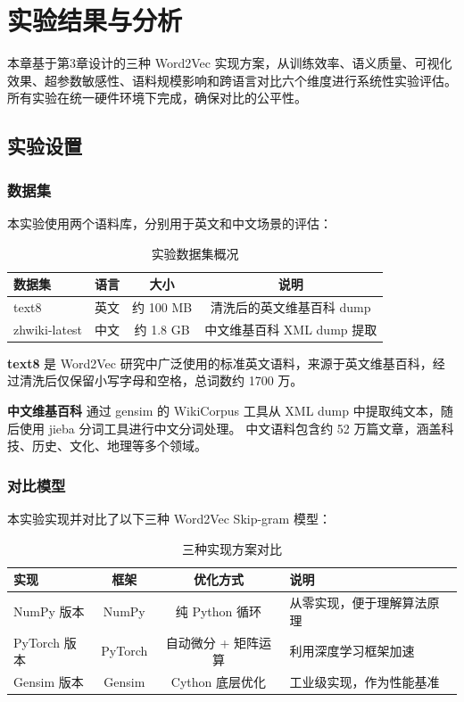 \chapter{实验结果与分析}

本章基于第3章设计的三种 Word2Vec 实现方案，从训练效率、语义质量、可视化效果、超参数敏感性、语料规模影响和跨语言对比六个维度进行系统性实验评估。
所有实验在统一硬件环境下完成，确保对比的公平性。

\section{实验设置}

\subsection{数据集}

本实验使用两个语料库，分别用于英文和中文场景的评估：

\begin{table}[htbp]
\centering
\caption{实验数据集概况}
\label{tab:dataset}
\begin{tabular}{lccc}
\toprule
\textbf{数据集} & \textbf{语言} & \textbf{大小} & \textbf{说明} \\
\midrule
text8 & 英文 & 约 100 MB & 清洗后的英文维基百科 dump \\
zhwiki-latest & 中文 & 约 1.8 GB & 中文维基百科 XML dump 提取 \\
\bottomrule
\end{tabular}
\end{table}

\textbf{text8} 是 Word2Vec 研究中广泛使用的标准英文语料，来源于英文维基百科，经过清洗后仅保留小写字母和空格，总词数约 1700 万。

\textbf{中文维基百科} 通过 gensim 的 WikiCorpus 工具从 XML dump 中提取纯文本，随后使用 jieba 分词工具进行中文分词处理。
中文语料包含约 52 万篇文章，涵盖科技、历史、文化、地理等多个领域。

\subsection{对比模型}

本实验实现并对比了以下三种 Word2Vec Skip-gram 模型：

\begin{table}[htbp]
\centering
\caption{三种实现方案对比}
\label{tab:models}
\begin{tabular}{lccl}
\toprule
\textbf{实现} & \textbf{框架} & \textbf{优化方式} & \textbf{说明} \\
\midrule
NumPy 版本 & NumPy & 纯 Python 循环 & 从零实现，便于理解算法原理 \\
PyTorch 版本 & PyTorch & 自动微分 + 矩阵运算 & 利用深度学习框架加速 \\
Gensim 版本 & Gensim & Cython 底层优化 & 工业级实现，作为性能基准 \\
\bottomrule
\end{tabular}
\end{table}

